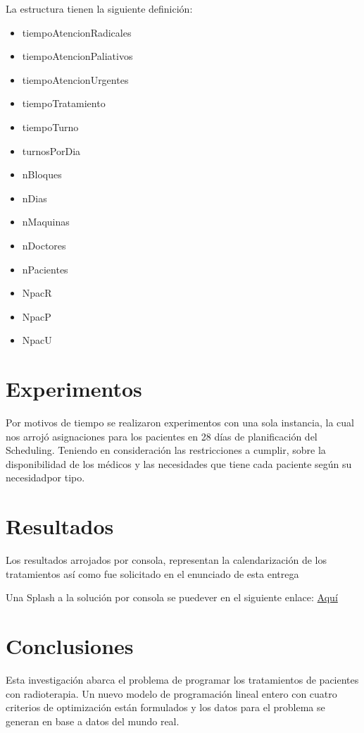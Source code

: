 \documentclass[letter, 10pt]{article}
\begin{document}
La estructura tienen la siguiente definición:
\begin{itemize}
    \item tiempoAtencionRadicales
    \item tiempoAtencionPaliativos
    \item tiempoAtencionUrgentes
    \item tiempoTratamiento
    \item tiempoTurno
    \item turnosPorDia
    \item nBloques
    \item nDias
    \item nMaquinas
    \item nDoctores
    \item nPacientes
    \item NpacR
    \item NpacP
    \item NpacU
\end{itemize}

\section{Experimentos}

Por motivos de tiempo se realizaron experimentos con una sola instancia, la cual nos arrojó asignaciones para los pacientes en 28 días de planificación del Scheduling. Teniendo en consideración las restricciones a cumplir, sobre la disponibilidad de los médicos y las necesidades que tiene cada paciente según su necesidadpor tipo.

\newpage

\section{Resultados}

Los resultados arrojados por consola, representan la calendarización de los tratamientos así como fue solicitado en el enunciado de esta entrega

Una Splash a la solución por consola se puedever en el siguiente enlace:
\href{https://drive.google.com/file/d/1IzHSBUH1M_DIlnG5B9K-yeht9l7D98dL/view?usp=sharing}{Aquí}


\newpage
\section{Conclusiones}

Esta investigación abarca el problema de programar los tratamientos de pacientes con radioterapia. Un nuevo modelo de programación lineal entero con cuatro criterios de optimización están formulados y los datos para el problema se generan en base a datos del mundo real.
\end{document}
